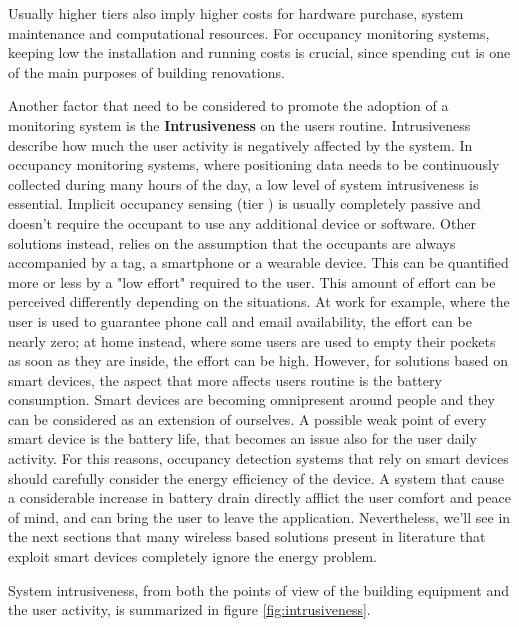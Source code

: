 Usually higher tiers also imply higher costs for hardware purchase, system maintenance and computational resources. For occupancy monitoring systems, keeping low the installation and running costs is crucial, since spending cut is one of the main purposes of building renovations.

Another factor that need to be considered to promote the adoption of a monitoring system is the \textbf{Intrusiveness} on the users routine. Intrusiveness describe how much the user activity is negatively affected by the system.
In occupancy monitoring systems, where positioning data needs to be continuously collected during many hours of the day, a low level of system intrusiveness is essential.
Implicit occupancy sensing (tier ) is usually completely passive and doesn't require the occupant to use any additional device or software.
Other solutions instead, relies on the assumption that the occupants are always accompanied by a tag, a smartphone or a wearable device. This can be quantified more or less by a "low effort" required to the user. This amount of effort can be perceived differently depending on the situations. At work for example, where the user is used to guarantee phone call and email availability, the effort can be nearly zero; at home instead, where some users are used to empty their pockets as soon as they are inside, the effort can be high.
However, for solutions based on smart devices, the aspect that more affects users routine is the battery consumption. Smart devices are becoming omnipresent around people and they can be considered as an extension of ourselves. A possible weak point of every smart device is the battery life, that becomes an issue also for the user daily activity. For this reasons, occupancy detection systems that rely on smart devices should carefully consider the energy efficiency of the device. A system that cause a considerable increase in battery drain directly afflict the user comfort and peace of mind, and can bring the user to leave the application. Nevertheless, we'll see in the next sections that many wireless based solutions present in literature that exploit smart devices completely ignore the energy problem.

System intrusiveness, from both the points of view of the building equipment and the user activity, is summarized in figure \ref{fig:intrusiveness}.

